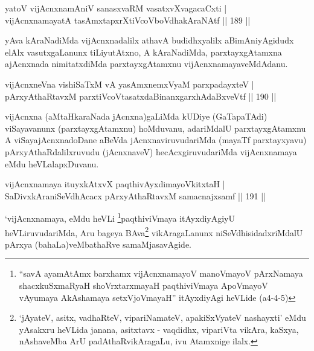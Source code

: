 \begin{shl}
yatoV vijAcnxnamAniV sanasxvaRM vasatxvXvagacaCxti |\\
vijAcnxnamayatA tasAmxtapxrXtiVcoV\s boVdhakAraNAtf \hfill || 189 ||
\end{shl}

\begin{artha}
yAva kAraNadiMda vijAcnxnadalilx athavA budidhxyalilx aBimAniyAgidudx elAlx vasutxgaLanunx tiLiyutAtxno, A kAraNadiMda, parxtayxgAtamxna ajAcnxnada nimitatxdiMda parxtayxgAtamxnu vijAcnxnamayaveMdAdanu.
\end{artha}


\begin{shl}
vijAcnxneVna vishiSaTxM vA yasAmxnemxVyaM parxpadayxteV |\\
pArxyAthaRtavxM parxtiVcoV\s tasatxdaBinanxgarxhAdaBxveVtf \hfill || 190 ||
\end{shl}

\begin{artha}
vijAcnxna (aMtaHkaraNada jAcnxna)gaLiMda kUDiye (GaTapaTAdi) viSayavanunx (parxtayxgAtamxnu) hoMduvanu, adariMdalU parxtayxgAtamxnu A viSayajAcnxnadoDane aBeVda jAcnxnaviruvudariMda (mayaTf parxtayxyavu) pArxyAthaRdalilxruvudu (jAcnxnaveV) hecAcxgiruvudariMda vijAcnxnamaya eMdu heVLalapxDuvanu.
\end{artha}

\begin{shl}
vijAcnxnamaya ituyxkAtxvX paqthivAyxdimayoVkitxtaH |\\
SaDivxkAraniSeVdhAcacx pArxyAthaRtavxM samacnajxsamf \hfill || 191 ||
\end{shl}

\begin{artha}
`vijAcnxnamaya, eMdu heVLi \footnote{``savA ayamAtAmx barxhamx vijAcnxnamayoV manoVmayoV pArxNamaya shacxkuSxmaRyaH shoVrxtarxmayaH paqthiviVmaya ApoVmayoV vAyumaya AkAshamaya setxVjoVmayaH'' itAyxdiyAgi heVLide (a4-4-5)}paqthiviVmaya itAyxdiyAgiyU heVLiruvudariMda, Aru bageya BAva\footnote{`jAyateV, asitx, vadhaRteV, vipariNamateV, apakiSxVyateV nashayxti' eMdu yAsakxru heVLida janana, asitxtavx - vaqdidhx, vipariVta vikAra, kaSxya, nAshaveMba ArU padAthaRvikAragaLu, ivu Atamxnige ilalx.} vikAragaLanunx niSeVdhisidadxriMdalU pArxya (bahaLa)veMbathaRve samaMjasavAgide.
\end{artha}



